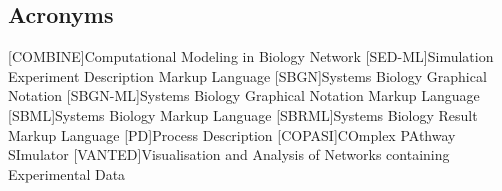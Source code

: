 \subsection*{Acronyms}
    \begin{acronym}[acrmeta]
        [COMBINE]{Computational Modeling in Biology Network}
        [SED-ML]{Simulation Experiment Description Markup Language}
        [SBGN]{Systems Biology Graphical Notation}
        [SBGN-ML]{Systems Biology Graphical Notation Markup Language}
        [SBML]{Systems Biology Markup Language}
        [SBRML]{Systems Biology Result Markup Language}
        [PD]{Process Description}
        [COPASI]{COmplex PAthway SImulator}
        [VANTED]{Visualisation and Analysis of Networks containing Experimental Data}
    \end{acronym}